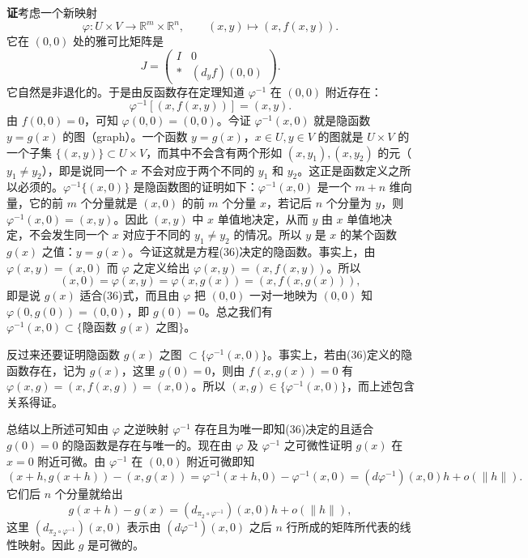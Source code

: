 \noindent\textbf{证}\quad 考虑一个新映射
\[
 \varphi:U\times V\to\mathbb R^m\times\mathbb R^n,
 \qquad
 (x,y)\longmapsto(x,f(x,y)).
\]
它在 $(0,0)$ 处的雅可比矩阵是
\[
 J=
 \begin{pmatrix}
  I&0\\
  *&(d_yf)(0,0)
 \end{pmatrix}.
\]
它自然是非退化的。于是由反函数存在定理知道 $\varphi^{-1}$ 在 $(0,0)$ 附近存在：\[\varphi^{-1}[(x,f(x,y))]=(x,y).\]由 $f(0,0)=0$，可知 $\varphi(0,0)=(0,0)$。今证 $\varphi^{-1}(x,0)$ 就是隐函数 $y=g(x)$ 的图（graph）。一个函数 $y=g(x)$，$x\in U,y\in V$ 的图就是 $U\times V$ 的一个子集 $\{(x,y)\}\subset U\times V$，而其中不会含有两个形如 $(x,y_1),(x,y_2)$ 的元（$y_1\ne y_2$），即是说同一个 $x$ 不会对应于两个不同的 $y_1$ 和 $y_2$。这正是函数定义之所以必须的。$\varphi^{-1}\{(x,0)\}$ 是隐函数图的证明如下：$\varphi^{-1}(x,0)$ 是一个 $m+n$ 维向量，它的前 $m$ 个分量就是 $(x,0)$ 的前 $m$ 个分量 $x$，若记后 $n$ 个分量为 $y$，则 $\varphi^{-1}(x,0)=(x,y)$。因此 $(x,y)$ 中 $x$ 单值地决定，从而 $y$ 由 $x$ 单值地决定，不会发生同一个 $x$ 对应于不同的 $y_1\ne y_2$ 的情况。所以 $y$ 是 $x$ 的某个函数 $g(x)$ 之值：$y=g(x)$。今证这就是方程(36)决定的隐函数。事实上，由 $\varphi(x,y)=(x,0)$ 而 $\varphi$ 之定义给出 $\varphi(x,y)=(x,f(x,y))$。所以
\[
 (x,0)=\varphi(x,y)=\varphi(x,g(x))=(x,f(x,g(x))),
\]
即是说 $g(x)$ 适合(36)式，而且由 $\varphi$ 把 $(0,0)$ 一对一地映为 $(0,0)$ 知 $\varphi(0,g(0))=(0,0)$，即 $g(0)=0$。总之我们有 $\varphi^{-1}(x,0)\subset\{\text{隐函数 }g(x)\text{ 之图}\}$。

反过来还要证明隐函数 $g(x)$ 之图 $\subset\{\varphi^{-1}(x,0)\}$。事实上，若由(36)定义的隐函数存在，记为 $g(x)$，这里 $g(0)=0$，则由 $f(x,g(x))=0$ 有 $\varphi(x,g)=(x,f(x,g))=(x,0)$。所以 $(x,g)\in\{\varphi^{-1}(x,0)\}$，而上述包含关系得证。

总结以上所述可知由 $\varphi$ 之逆映射 $\varphi^{-1}$ 存在且为唯一即知(36)决定的且适合 $g(0)=0$ 的隐函数是存在与唯一的。现在由 $\varphi$ 及 $\varphi^{-1}$ 之可微性证明 $g(x)$ 在 $x=0$ 附近可微。由 $\varphi^{-1}$ 在 $(0,0)$ 附近可微即知
\[
 (x+h,g(x+h))-(x,g(x))
 =\varphi^{-1}(x+h,0)-\varphi^{-1}(x,0)
 =(d\varphi^{-1})(x,0)h+o(\|h\|).
\]
它们后 $n$ 个分量就给出
\[
 g(x+h)-g(x)=(d_{\pi_2\circ\varphi^{-1}})(x,0)h+o(\|h\|),
\]
这里 $(d_{\pi_2\circ\varphi^{-1}})(x,0)$ 表示由 $(d\varphi^{-1})(x,0)$ 之后 $n$ 行所成的矩阵所代表的线性映射。因此 $g$ 是可微的。

